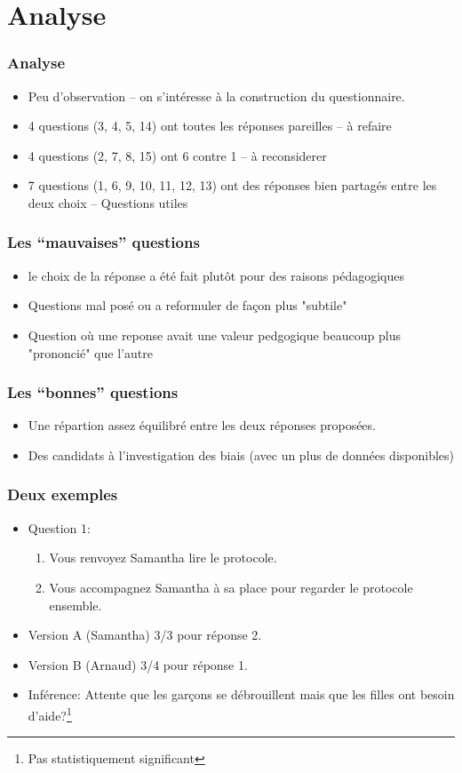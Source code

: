 \documentclass{beamer}
\begin{document}
\section{Analyse}
\begin{frame}
  \frametitle{Analyse}
  \begin{itemize}
  \item Peu d'observation -- on s'intéresse à la construction du questionnaire.
  \item 4 questions (3, 4, 5, 14) ont toutes les réponses pareilles -- à refaire
  \item 4 questions (2, 7, 8, 15) ont 6 contre 1 -- à reconsiderer
  \item 7 questions (1, 6, 9, 10, 11, 12, 13) ont des réponses bien partagés
    entre les deux choix -- Questions utiles
  \end{itemize}
\end{frame}

\begin{frame}
  \frametitle{Les ``mauvaises'' questions}
  \begin{itemize}
\item le choix de la réponse a été fait plutôt  pour des raisons pédagogiques  
\item Questions mal posé ou a reformuler de façon plus "subtile"
\item Question où une reponse avait une valeur pedgogique beaucoup plus "prononcié" que l'autre
\end{itemize}
\end{frame}

\begin{frame}
  \frametitle{Les ``bonnes'' questions}
  \begin{itemize}
  \item Une répartion assez équilibré entre les deux réponses proposées.
  \item  Des candidats à l'investigation des biais (avec un plus de données disponibles)
  \end{itemize}
\end{frame}

\begin{frame}
  \frametitle{Deux exemples}
  \begin{itemize}
  \item Question 1:
    \begin{enumerate}
    \item Vous renvoyez Samantha lire le protocole. 
    \item Vous accompagnez Samantha à sa place pour regarder le protocole ensemble. 
    \end{enumerate}
  \item Version A (Samantha) 3/3 pour réponse 2.
  \item Version B (Arnaud) 3/4 pour réponse 1.
  \item Inférence: Attente que les garçons se débrouillent mais que les filles ont
    besoin d'aide?\footnote{Pas statistiquement significant} 
  \end{itemize}
\end{frame}
\end{document}
